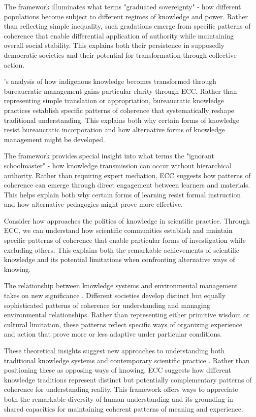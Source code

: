 \begin{refsection}
The framework illuminates what \cite{ong2006neoliberalism} terms "graduated sovereignty" - how different populations become subject to different regimes of knowledge and power. Rather than reflecting simple inequality, such gradations emerge from specific patterns of coherence that enable differential application of authority while maintaining overall social stability. This explains both their persistence in supposedly democratic societies and their potential for transformation through collective action.

\cite{nadasdy2003hunters}'s analysis of how indigenous knowledge becomes transformed through bureaucratic management gains particular clarity through ECC. Rather than representing simple translation or appropriation, bureaucratic knowledge practices establish specific patterns of coherence that systematically reshape traditional understanding. This explains both why certain forms of knowledge resist bureaucratic incorporation and how alternative forms of knowledge management might be developed.

The framework provides special insight into what \cite{ranciere1991ignorant} terms the "ignorant schoolmaster" - how knowledge transmission can occur without hierarchical authority. Rather than requiring expert mediation, ECC suggests how patterns of coherence can emerge through direct engagement between learners and materials. This helps explain both why certain forms of learning resist formal instruction and how alternative pedagogies might prove more effective.

Consider how \cite{stengers2010cosmopolitics} approaches the politics of knowledge in scientific practice. Through ECC, we can understand how scientific communities establish and maintain specific patterns of coherence that enable particular forms of investigation while excluding others. This explains both the remarkable achievements of scientific knowledge and its potential limitations when confronting alternative ways of knowing.

The relationship between knowledge systems and environmental management takes on new significance \cite{tsing2005friction}. Different societies develop distinct but equally sophisticated patterns of coherence for understanding and managing environmental relationships. Rather than representing either primitive wisdom or cultural limitation, these patterns reflect specific ways of organizing experience and action that prove more or less adaptive under particular conditions.

These theoretical insights suggest new approaches to understanding both traditional knowledge systems and contemporary scientific practice \cite{strathern1991partial}. Rather than positioning these as opposing ways of knowing, ECC suggests how different knowledge traditions represent distinct but potentially complementary patterns of coherence for understanding reality. This framework offers ways to appreciate both the remarkable diversity of human understanding and its grounding in shared capacities for maintaining coherent patterns of meaning and experience.


\end{refsection}
